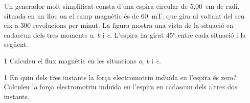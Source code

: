Un generador molt simplificat consta d'una espira circular de 5,00~cm de radi, situada en un lloc on el camp magnètic és de 60~mT, que gira al voltant del seu eix a 300 revolucions per minut. La figura mostra una vista de la situació en cadascun dels tres moments \textit{a}, \textit{b} i \textit{c}. L'espira ha girat 45° entre cada situació i la següent.


\begin{apartat}{1}
Calculeu el flux magnètic en les situacions \textit{a}, \textit{b} i \textit{c}.
\end{apartat}

\begin{apartat}{1}
En quin dels tres instants la força electromotriu induïda en l'espira és zero? Calculeu la força electromotriu induïda en l'espira en cadascun dels altres dos instants.
\end{apartat}
